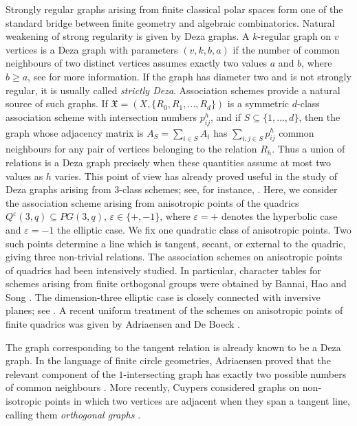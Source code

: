 \documentclass{article}
\theoremstyle{plain}
\begin{document}
Strongly regular graphs arising from finite classical polar spaces form one of the standard bridge between finite geometry and algebraic combinatorics. Natural weakening of strong regularity is given by Deza
graphs. A $k$-regular graph on $v$ vertices is a Deza graph with parameters $(v,k,b,a)$ if the number of common neighbours of two distinct vertices assumes exactly two values $a$ and $b$, where $b\geq a$, see \cite{EricksonEtAl1999} for more information. If the graph has diameter two and is not strongly regular, it is usually called \emph{strictly Deza}. 
Association schemes provide a natural source of such graphs. If $\mathfrak X=(X,\{R_0,R_1,\ldots,R_d\})$ is a symmetric $d$-class association scheme with intersection numbers $p_{ij}^h$, and if $S\subseteq\{1,\ldots,d\}$, then the graph whose adjacency matrix
is $A_S=\sum_{i\in S}A_i$ has $\sum_{i,j\in S}p_{ij}^{h}$ common neighbours for any pair of vertices belonging to the relation $R_h$. Thus a union of relations is a Deza graph precisely when these quantities assume at most two values as $h$ varies. This point of view has already proved useful in the study of Deza graphs arising from $3$-class schemes; see, for instance, \cite{GoryainovShalaginov2021}. Here, we consider the association scheme arising from anisotropic points of the quadrics $Q^\varepsilon(3,q)\subseteq PG(3,q)$, $\varepsilon\in\{+,-1\}$, where $\varepsilon=+$ denotes the hyperbolic case and
$\varepsilon=-1$ the elliptic case. We fix one quadratic class of anisotropic points. Two such points determine a line which is tangent, secant, or external to the quadric, giving three non-trivial relations. The association schemes on anisotropic points of quadrics had been intensively studied. In particular, character tables for schemes arising from
finite orthogonal groups were obtained by Bannai, Hao and Song \cite{BannaiHaoSong1990}.  
The dimension-three elliptic case is closely
connected with inversive planes; see \cite{FisherEtAl1989}. A recent uniform treatment of the schemes on anisotropic points of finite quadrics was given by Adriaensen and De Boeck \cite{AdriaensenDeBoeck2025}.

The graph corresponding to the tangent relation is already known to be a Deza graph. In the language of finite circle geometries, Adriaensen proved that the relevant component of the $1$-intersecting graph has
exactly two possible numbers of common neighbours
\cite[Lemma~4.6]{Adriaensen2022}. More recently, Cuypers considered graphs on non-isotropic points in which two vertices are adjacent when they span a tangent line, calling them \emph{orthogonal graphs}
\cite{Cuypers2026}.
\end{document}
